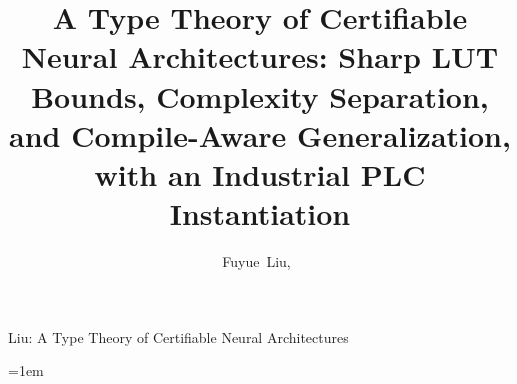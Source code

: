 \documentclass[journal,onecolumn]{IEEEtran}
\begin{document}
\title{A Type Theory of Certifiable Neural Architectures: Sharp LUT Bounds, Complexity Separation, and Compile-Aware Generalization, with an Industrial PLC Instantiation}

\author{Fuyue~Liu,~}

%
         {Liu: A Type Theory of Certifiable Neural Architectures}

\maketitle

\raggedbottom
\emergencystretch=1em
\end{document}
